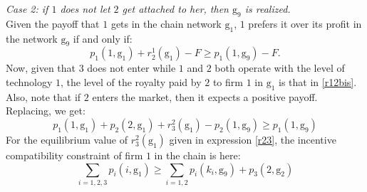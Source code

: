 \documentclass{article}
\begin{document}
\textit{Case 2: if $1$ does not let $2$ get attached to her, then $\text{g}_9$ is realized.}\\
\indent Given the payoff that $1$ gets in the chain network $\text{g}_1$, $1$ prefers it over its profit in the network $\text{g}_9$ if and only if:
\begin{equation*}
    p_1(1,\text{g}_1)+r^1_2(\text{g}_1)-F\geq p_1(1,\text{g}_9) -F. 
\end{equation*}
Now, given that $3$ does not enter while $1$ and $2$ both operate with the level of technology $1$, the level of the royalty paid by $2$ to firm $1$ in $\text{g}_1$ is that in \eqref{r12bis}. Also, note that if $2$ enters the market, then it expects a positive payoff. Replacing, we get: 
\begin{equation*}
    p_1(1,\text{g}_1)+p_2(2,\text{g}_1) +r^2_3(\text{g}_1)- p_2(1,\text{g}_9)\geq p_1(1,\text{g}_9)
\end{equation*}
For the equilibrium value of $r^2_3(\text{g}_1)$ given in expression \eqref{r23}, the incentive compatibility constraint of firm $1$ in the chain is here: 
\begin{equation}
    \sum_{i=1,2,3} p_i(i,\text{g}_1)\geq \sum_{i=1,2} p_i(k_i,\text{g}_9)+p_3(2,\text{g}_2)
\end{equation}
\end{document}
